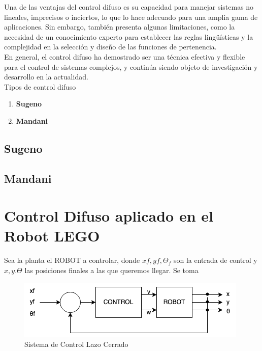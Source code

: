 \documentclass[oneside,onecolumn]{article}
\begin{document}
Una de las ventajas del control difuso es su capacidad para manejar sistemas no lineales, imprecisos o inciertos, lo que lo hace adecuado para una amplia gama de aplicaciones. Sin embargo, también presenta algunas limitaciones, como la necesidad de un conocimiento experto para establecer las reglas lingüísticas y la complejidad en la selección y diseño de las funciones de pertenencia.\\

En general, el control difuso ha demostrado ser una técnica efectiva y flexible para el control de sistemas complejos, y continúa siendo objeto de investigación y desarrollo en la actualidad.\\

Tipos de control difuso
\begin{enumerate}
\item \textbf{Sugeno}
\item \textbf{Mandani}
\end{enumerate}

\subsection{Sugeno} 

\subsection{Mandani}



\section{Control Difuso aplicado en el Robot LEGO}

Sea la planta el ROBOT a controlar, donde $xf, yf, \Theta_{f}$ son la entrada de control y $x, y. \Theta$ las posiciones finales a las que queremos llegar. Se toma 

\begin{figure}[h]
  \centering
  \includegraphics[scale=0.7]{graficos/bloque.png}
  \caption{Sistema de Control Lazo Cerrado}
\end{figure}
\end{document}
